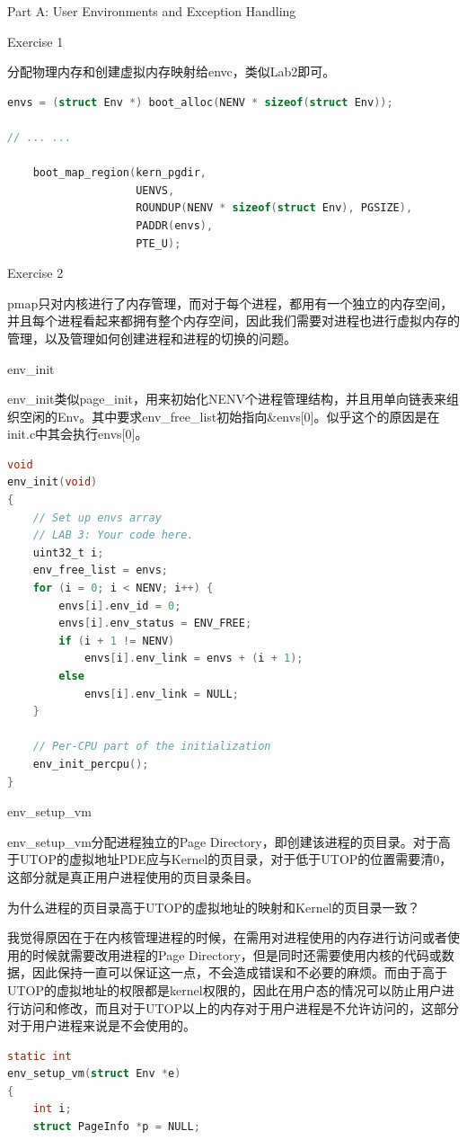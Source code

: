\documentclass[GBK,winfonts,a4paper,10pt]{ctexart}
\begin{document}
\begin{section}{ Part A: User Environments and Exception Handling }
\begin{subsection}{ Exercise 1 }
\par
分配物理内存和创建虚拟内存映射给envc，类似Lab2即可。
\begin{lstlisting}[language=C]
	envs = (struct Env *) boot_alloc(NENV * sizeof(struct Env));

// ... ...

    boot_map_region(kern_pgdir,
                    UENVS,
                    ROUNDUP(NENV * sizeof(struct Env), PGSIZE),
                    PADDR(envs),
                    PTE_U);
\end{lstlisting}
\end{subsection}

\begin{subsection}{ Exercise 2 }
\par
pmap只对内核进行了内存管理，而对于每个进程，都用有一个独立的内存空间，并且每个进程看起来都拥有整个内存空间，因此我们需要对进程也进行虚拟内存的管理，以及管理如何创建进程和进程的切换的问题。

\begin{subsubsection}{env\_init}
\par
env\_init类似page\_init，用来初始化NENV个进程管理结构，并且用单向链表来组织空闲的Env。其中要求env\_free\_list初始指向\&envs[0]。似乎这个的原因是在init.c中其会执行envs[0]。
\begin{lstlisting}[language=C]
void
env_init(void)
{
	// Set up envs array
	// LAB 3: Your code here.
    uint32_t i;
    env_free_list = envs;
    for (i = 0; i < NENV; i++) {
        envs[i].env_id = 0;
        envs[i].env_status = ENV_FREE;
        if (i + 1 != NENV)
            envs[i].env_link = envs + (i + 1);
        else 
            envs[i].env_link = NULL;
    }

	// Per-CPU part of the initialization
	env_init_percpu();
}
\end{lstlisting}
\end{subsubsection}

\begin{subsubsection}{env\_setup\_vm}
\par
env\_setup\_vm分配进程独立的Page Directory，即创建该进程的页目录。对于高于UTOP的虚拟地址PDE应与Kernel的页目录，对于低于UTOP的位置需要清0，这部分就是真正用户进程使用的页目录条目。
\par
为什么进程的页目录高于UTOP的虚拟地址的映射和Kernel的页目录一致？
\par
我觉得原因在于在内核管理进程的时候，在需用对进程使用的内存进行访问或者使用的时候就需要改用进程的Page Directory，但是同时还需要使用内核的代码或数据，因此保持一直可以保证这一点，不会造成错误和不必要的麻烦。而由于高于UTOP的虚拟地址的权限都是kernel权限的，因此在用户态的情况可以防止用户进行访问和修改，而且对于UTOP以上的内存对于用户进程是不允许访问的，这部分对于用户进程来说是不会使用的。
\begin{lstlisting}[language=C]
static int
env_setup_vm(struct Env *e)
{
	int i;
	struct PageInfo *p = NULL;


\end{lstlisting}
\end{subsubsection}
\end{subsection}
\end{section}
\end{document}
